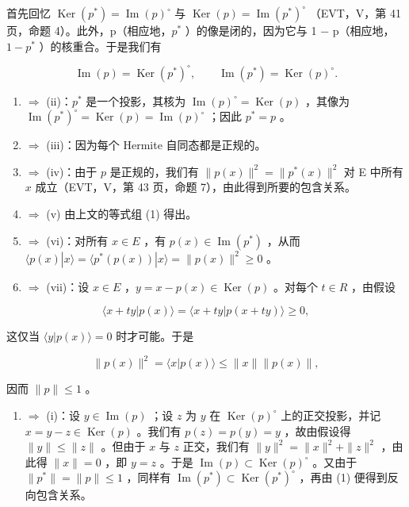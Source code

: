首先回忆 \(\operatorname{Ker}(p^{*}) = \operatorname{Im}(p)^{\circ}\) 与 \(\operatorname{Ker}(p) = \operatorname{Im}(p^{*})^{\circ}\) （EVT，V，第 41 页，命题 4）。此外，p（相应地，\(p^{*}\) ）的像是闭的，因为它与 1 − p（相应地，\(1 - p^{*}\) ）的核重合。于是我们有

\[
\operatorname{Im} (p) = \operatorname{Ker} (p ^ {*}) ^ {\circ}, \qquad \operatorname{Im} (p ^ {*}) = \operatorname{Ker} (p) ^ {\circ}.\tag{1}
\]

\begin{enumerate}
\def\labelenumi{(\roman{enumi})}
\item
  \(\Longrightarrow\) (ii)：\(p^{*}\) 是一个投影，其核为 \(\operatorname{Im}(p)^{\circ} = \operatorname{Ker}(p)\) ，其像为 \(\operatorname{Im}(p^{*})^{\circ} = \operatorname{Ker}(p) = \operatorname{Im}(p)^{\circ}\) ；因此 \(p^{*} = p\) 。
\item
  \(\Longrightarrow\) (iii)：因为每个 Hermite 自同态都是正规的。
\item
  \(\Longrightarrow\) (iv)：由于 \(p\) 是正规的，我们有 \(\| p(x)\|^2 = \| p^*(x)\|^2\) 对 E 中所有 \(x\) 成立（EVT，V，第 43 页，命题 7），由此得到所要的包含关系。
\item
  \(\Longrightarrow\) (v) 由上文的等式组 (1) 得出。
\item
  \(\Longrightarrow\) (vi)：对所有 \(x \in E\) ，有 \(p(x) \in \operatorname{Im}(p^{*})\) ，从而 \(\langle p(x)|x\rangle = \langle p^{*}(p(x))|x\rangle = \|p(x)\|^{2} \geqslant 0\) 。
\item
  \(\Longrightarrow\) (vii)：设 \(x \in E\) ，\(y = x - p(x) \in \operatorname{Ker}(p)\) 。对每个 \(t \in R\) ，由假设
\end{enumerate}

\[
\langle x + t y | p (x) \rangle = \langle x + t y | p (x + t y) \rangle \geqslant 0,
\]

这仅当 \(\langle y|p(x)\rangle = 0\) 时才可能。于是

\[
\| p (x) \| ^ {2} = \langle x | p (x) \rangle \leqslant \| x \| \| p (x) \|,
\]

因而 \(\|p\|\leqslant1\) 。

\begin{enumerate}
\def\labelenumi{(\roman{enumi})}
\setcounter{enumi}{6}
\tightlist
\item
  \(\Longrightarrow\) (i)：设 \(y \in \operatorname{Im}(p)\) ；设 \(z\) 为 \(y\) 在 \(\operatorname{Ker}(p)^{\circ}\) 上的正交投影，并记 \(x = y - z \in \operatorname{Ker}(p)\) 。我们有 \(p(z) = p(y) = y\) ，故由假设得 \(\|y\| \leqslant \|z\|\) 。但由于 \(x\) 与 \(z\) 正交，我们有 \(\|y\|^2 = \|x\|^2 + \|z\|^2\) ，由此得 \(\|x\| = 0\) ，即 \(y = z\) 。于是 \(\operatorname{Im}(p) \subset \operatorname{Ker}(p)^{\circ}\) 。又由于 \(\|p^*\| = \|p\| \leqslant 1\) ，同样有 \(\operatorname{Im}(p^*) \subset \operatorname{Ker}(p^*)^{\circ}\) ，再由 (1) 便得到反向包含关系。
\end{enumerate}

